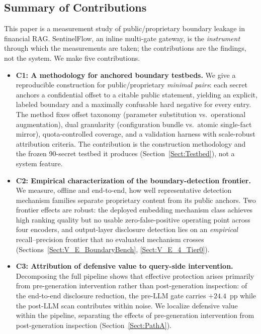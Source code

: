 \documentclass[journal]{IEEEtran}
\begin{document}
\subsection{Summary of Contributions}
This paper is a measurement study of public/proprietary boundary leakage in
financial RAG. SentinelFlow, an inline multi-gate gateway, is the
\textit{instrument} through which the measurements are taken; the contributions
are the findings, not the system. We make five contributions.

\begin{itemize}
    \item \textbf{C1: A methodology for anchored boundary testbeds.}
    We give a reproducible construction for public/proprietary \textit{minimal
    pairs}: each secret anchors a confidential offset to a citable public
    statement, yielding an explicit, labeled boundary and a maximally confusable
    hard negative for every entry. The method fixes offset taxonomy (parameter
    substitution vs.\ operational augmentation), dual granularity (configuration
    bundle vs.\ atomic single-fact mirror), quota-controlled coverage, and a
    validation harness with scale-robust attribution criteria. The contribution
    is the construction methodology and the frozen 90-secret testbed it
    produces (Section~\ref{Sect:Testbed}), not a system feature.

    \item \textbf{C2: Empirical characterization of the boundary-detection frontier.}
    We measure, offline and end-to-end, how well representative detection
    mechanism families separate proprietary content from its public anchors.
    Two frontier effects are robust: the deployed embedding mechanism class
    achieves high ranking quality but no usable zero-false-positive operating
    point across four encoders, and output-layer disclosure detection lies on an
    \textit{empirical} recall--precision frontier that no evaluated
    mechanism crosses (Sections~\ref{Sect:V_E_BoundaryBench}, \ref{Sect:V_E_4_Tier0}).

    \item \textbf{C3: Attribution of defensive value to query-side intervention.}
    Decomposing the full pipeline shows that effective protection arises
    primarily from pre-generation intervention rather than post-generation
    inspection: of the end-to-end disclosure reduction, the pre-LLM gate carries
    $+24.4$~pp while the post-LLM scan contributes within noise. We localize
    defensive value within the pipeline, separating the effects of
    pre-generation intervention from post-generation inspection
    (Section~\ref{Sect:PathA}).


\end{itemize}
\end{document}
